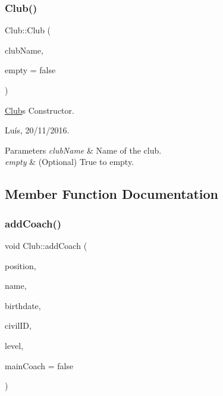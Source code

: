 \subsubsection{\texorpdfstring{Club()}{Club()}\hspace{0.1cm}{\footnotesize\ttfamily [2/2]}}
{\footnotesize\ttfamily Club\+::\+Club (\begin{DoxyParamCaption}\item[{string}]{club\+Name,  }\item[{bool}]{empty = {\ttfamily false} }\end{DoxyParamCaption})}



\hyperlink{class_club}{Club}\textquotesingle{}s Constructor. 

Luís, 20/11/2016. 


\begin{DoxyParams}{Parameters}
{\em club\+Name} & Name of the club. \\
\hline
{\em empty} & (Optional) True to empty. \\
\hline
\end{DoxyParams}


\subsection{Member Function Documentation}
\hypertarget{class_club_ab75ce29b014480adce6c4628c1dd8e0b}{}\label{class_club_ab75ce29b014480adce6c4628c1dd8e0b} 
\subsubsection{\texorpdfstring{add\+Coach()}{addCoach()}}
{\footnotesize\ttfamily void Club\+::add\+Coach (\begin{DoxyParamCaption}\item[{\hyperlink{_utils_8hpp_ad6bce769911d709b802464c1ec12e7ad}{Coach\+Type}}]{position,  }\item[{string}]{name,  }\item[{\hyperlink{class_date}{Date}}]{birthdate,  }\item[{unsigned int}]{civil\+ID,  }\item[{\hyperlink{_utils_8hpp_a226b190c54f09ab6ba8ac83b28e3c4b6}{age\+Level}}]{level,  }\item[{bool}]{main\+Coach = {\ttfamily false} }\end{DoxyParamCaption})}



